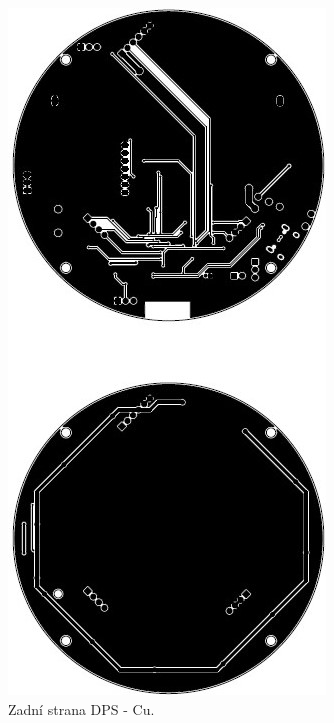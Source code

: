 \begin{figure}[!h]
	\begin{center}
	  \includegraphics[scale=1.1]{obrazky/Vyrobni_podkady_B_Cu.jpg}
	\end{center}
	\caption[Zadní strana DPS - Cu]{Zadní strana DPS - Cu.}
\end{figure}

